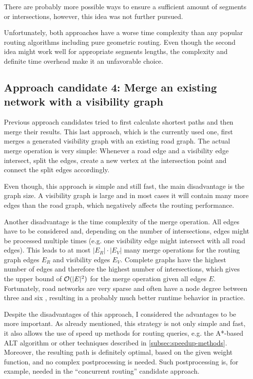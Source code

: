 		There are probably more possible ways to ensure a sufficient amount of segments or intersections, however, this idea was not further pursued.
		
		Unfortunately, both approaches have a worse time complexity than any popular routing algorithms including pure geometric routing.
		Even though the second idea might work well for appropriate segments lengths, the complexity and definite time overhead make it an unfavorable choice.
	
	\subsection{Approach candidate 4: Merge an existing network with a visibility graph}
	
		Previous approach candidates tried to first calculate shortest paths and then merge their results.
		This last approach, which is the currently used one, first merges a generated visibility graph with an existing road graph.
		The actual merge operation is very simple:
		Whenever a road edge and a visibility edge intersect, split the edges, create a new vertex at the intersection point and connect the split edges accordingly.
		
		Even though, this approach is simple and still fast, the main disadvantage is the graph size.
		A visibility graph is large and in most cases it will contain many more edges than the road graph, which negatively affects the routing performance.
		
		Another disadvantage is the time complexity of the merge operation.
		All edges have to be considered and, depending on the number of intersections, edges might be processed multiple times (e.g. one visibility edge might intersect with all road edges).
		This leads to at most $|E_R| \cdot |E_V|$ many merge operations for the routing graph edges $E_R$ and visibility edges $E_V$.
		Complete graphs have the highest number of edges and therefore the highest number of intersections, which gives the upper bound of $\mathcal{O}(|E|^2)$ for the merge operation given all edges $E$.
		Fortunately, road networks are very sparse and often have a node degree between three and six \cite{zhao-analysis-osm-bejing}\cite{boeing-osmnx}, resulting in a probably much better runtime behavior in practice.
		
		Despite the disadvantages of this approach, I considered the advantages to be more important.
		As already mentioned, this strategy is not only simple and fast, it also allows the use of speed up methods for routing queries, e.g. the A*-based ALT algorithm or other techniques described in \cref{subsec:speedup-methods}.
		Moreover, the resulting path is definitely optimal, based on the given weight function, and no complex postprocessing is needed.
		Such postprocessing is, for example, needed in the \enquote{concurrent routing} candidate approach.
		
